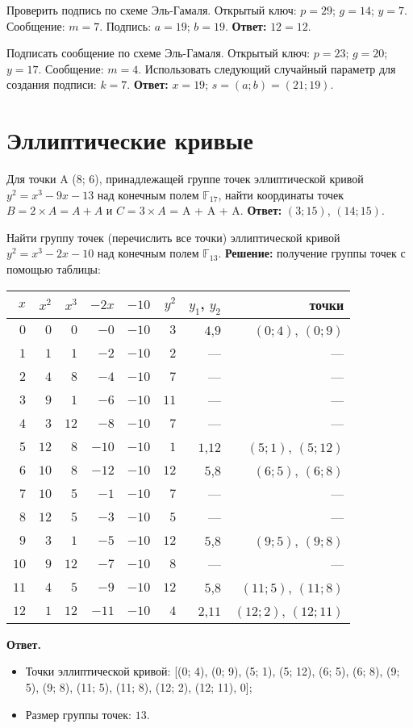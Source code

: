 \tasknumber Проверить подпись по схеме Эль-Гамаля. Открытый ключ: $p = 29$; $g = 14$; $y = 7$. Сообщение: $m = 7$. Подпись: $a = 19$;  $b = 19$.
\medbreak
\textbf{Ответ:} $12 = 12$.
\bigbreak

\tasknumber Подписать сообщение по схеме Эль-Гамаля. Открытый ключ: $p = 23$; $g = 20$; $y = 17$. Сообщение: $m = 4$. Использовать следующий случайный параметр для создания подписи: $k = 7$.
\medbreak
\textbf{Ответ:} $x = 19$; $s = (a; b) = (21; 19)$.
\bigbreak

\section{Эллиптические кривые}
\tasksection

\tasknumber Для точки A (8; 6), принадлежащей группе точек эллиптической кривой $y^2 = x^3 - 9x - 13$ над конечным полем $\mathbb{F}_{17}$, найти координаты точек $B = 2 \times A = A + A$ и $C = 3 \times A$ = A + A + A.
\medbreak
\textbf{Ответ:} $(3; 15)$, $(14; 15)$.
\bigbreak

\tasknumber Найти группу точек (перечислить все точки) эллиптической кривой $y^2 = x^3 - 2 x - 10$ над конечным полем $\mathbb{F}_{13}$.
\medbreak
\textbf{Решение:} получение группы точек с помощью таблицы:\\
\begin{tabular}{|r|r|r|r|r|r|r|r|}
\hline
$x$ & $x^2$ & $x^3$ & $-2x$ & $-10$ & $y^2$ & $y_1$, $y_2$ & точки \\ 
\hline
$0$ & $0$ & $0$ & $-0$ & $-10$ & $3$ & $4$,$9$ &$(0; 4)$, $(0; 9)$ \\ 
$1$ & $1$ & $1$ & $-2$ & $-10$ & $2$ &  --- & --- \\ 
$2$ & $4$ & $8$ & $-4$ & $-10$ & $7$ &  --- & --- \\ 
$3$ & $9$ & $1$ & $-6$ & $-10$ & $11$ &  --- & --- \\ 
$4$ & $3$ & $12$ & $-8$ & $-10$ & $7$ &  --- & --- \\
$5$ & $12$ & $8$ & $-10$ & $-10$ & $1$ & $1$,$12$ &$(5; 1)$, $(5; 12)$ \\
$6$ & $10$ & $8$ & $-12$ & $-10$ & $12$ & $5$,$8$ &$(6; 5)$, $(6; 8)$ \\ 
$7$ & $10$ & $5$ & $-1$ & $-10$ & $7$ &  --- & --- \\ 
$8$ & $12$ & $5$ & $-3$ & $-10$ & $5$ &  --- & --- \\ 
$9$ & $3$ & $1$ & $-5$ & $-10$ & $12$ & $5$,$8$ &$(9; 5)$, $(9; 8)$ \\ 
$10$ & $9$ & $12$ & $-7$ & $-10$ & $8$ &  --- & --- \\ 
$11$ & $4$ & $5$ & $-9$ & $-10$ & $12$ & $5$,$8$ &$(11; 5)$, $(11; 8)$ \\ 
$12$ & $1$ & $12$ & $-11$ & $-10$ & $4$ & $2$,$11$ &$(12; 2)$, $(12; 11)$ \\ 
\hline
\end{tabular}
\medbreak
\textbf{Ответ.}
\begin{itemize}
\item Точки эллиптической кривой: [(0; 4), (0; 9), (5; 1), (5; 12), (6; 5), (6; 8), (9; 5), (9; 8), (11; 5), (11; 8), (12; 2), (12; 11), 0];
\item Размер группы точек: $13$.
\end{itemize}
\bigbreak

